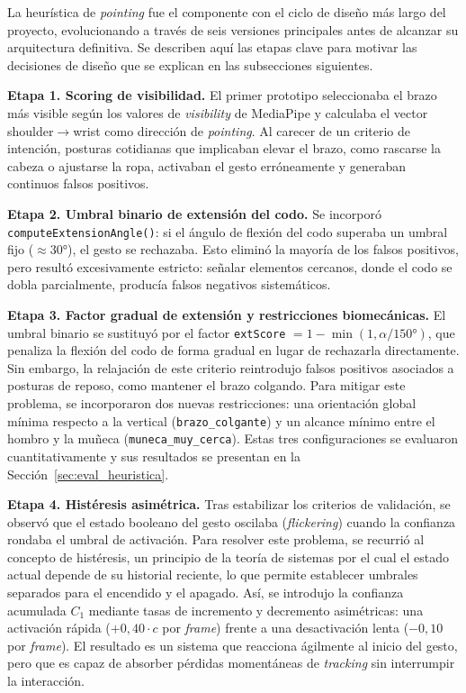 \documentclass[12pt]{report} %
\begin{document}
La heurística de \textit{pointing} fue el componente con el ciclo de diseño más largo del proyecto, evolucionando a través de seis versiones principales antes de alcanzar su arquitectura definitiva. Se describen aquí las etapas clave para motivar las decisiones de diseño que se explican en las subsecciones siguientes.

\textbf{Etapa 1. Scoring de visibilidad.} El primer prototipo seleccionaba el brazo más visible según los valores de \textit{visibility} de MediaPipe y calculaba el vector shoulder$\rightarrow$wrist como dirección de \textit{pointing}. Al carecer de un criterio de intención, posturas cotidianas que implicaban elevar el brazo, como rascarse la cabeza o ajustarse la ropa, activaban el gesto erróneamente y generaban continuos falsos positivos.

\textbf{Etapa 2. Umbral binario de extensión del codo.} Se incorporó \texttt{computeExtensionAngle()}: si el ángulo de flexión del codo superaba un umbral fijo ($\approx 30°$), el gesto se rechazaba. Esto eliminó la mayoría de los falsos positivos, pero resultó excesivamente estricto: señalar elementos cercanos, donde el codo se dobla parcialmente, producía falsos negativos sistemáticos.

\textbf{Etapa 3. Factor gradual de extensión y restricciones biomecánicas.} El umbral binario se sustituyó por el factor \texttt{extScore} $= 1 - \min(1, \alpha/150°)$, que penaliza la flexión del codo de forma gradual en lugar de rechazarla directamente. Sin embargo, la relajación de este criterio reintrodujo falsos positivos asociados a posturas de reposo, como mantener el brazo colgando. Para mitigar este problema, se incorporaron dos nuevas restricciones: una orientación global mínima respecto a la vertical (\texttt{brazo\_colgante}) y un alcance mínimo entre el hombro y la muñeca (\texttt{muneca\_muy\_cerca}). Estas tres configuraciones se evaluaron cuantitativamente y sus resultados se presentan en la Sección~\ref{sec:eval_heuristica}.

\textbf{Etapa 4. Histéresis asimétrica.} Tras estabilizar los criterios de validación, se observó que el estado booleano del gesto oscilaba (\textit{flickering}) cuando la confianza rondaba el umbral de activación. Para resolver este problema, se recurrió al concepto de histéresis, un principio de la teoría de sistemas por el cual el estado actual depende de su historial reciente, lo que permite establecer umbrales separados para el encendido y el apagado. Así, se introdujo la confianza acumulada $C_1$ mediante tasas de incremento y decremento asimétricas: una activación rápida ($+0,40 \cdot c$ por \textit{frame}) frente a una desactivación lenta ($-0,10$ por \textit{frame}). El resultado es un sistema que reacciona ágilmente al inicio del gesto, pero que es capaz de absorber pérdidas momentáneas de \textit{tracking} sin interrumpir la interacción.
\end{document}

